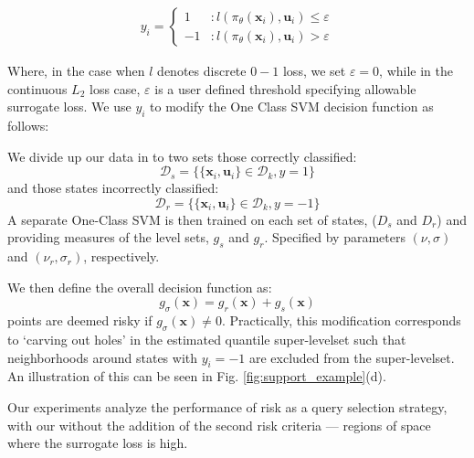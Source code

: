 \documentclass[10pt, conference]{ieeeconf}      %
\newcommand{\bu}{\mathbf{u}}
\newcommand{\bx}{\mathbf{x}}
\newcommand{\acro}{SHIV}
\begin{document}
\begin{align}
y_i = \left\{
     \begin{array}{lr}
         1 & : l(\pi_{\theta}(\bx_i),\bu_i)\le \varepsilon\\
         -1 & : l(\pi_{\theta}(\bx_i),\bu_i)>\varepsilon
     \end{array}
   \right.
\end{align}

Where, in the case when $l$ denotes discrete $0-1$ loss, we set $\varepsilon = 0$, while in the continuous $L_2$ loss
case, $\varepsilon$ is a user defined threshold specifying allowable surrogate loss.
We use $y_i$ to modify the One Class SVM decision function as follows: 


We divide up our data in to two sets those correctly classified:
$$\mathcal{D}_{s}=\{\lbrace \bx_i,\bu_i \rbrace \in \mathcal{D}_{k}, y=1\}$$
and those states incorrectly classified: 
$$\mathcal{D}_{r}=\{\lbrace \bx_i,\bu_i \rbrace \in \mathcal{D}_{k}, y=-1\}$$
A separate One-Class SVM is then trained on each set of states, ($D_{s}$ and $D_{r}$) and providing measures of the level sets, $g_{s}$ and $g_{r}$. Specified by parameters $(\nu,\sigma)$ and $(\nu_r,\sigma_r)$, respectively. 

We then define the overall decision function as:
$$g_{\sigma}(\bx) = g_{r} (\bx)+ g_{s}(\bx)$$
points are deemed risky if $g_{\sigma}(\bx) \neq 0$.  Practically, this modification corresponds to
`carving out holes' in the estimated quantile super-levelset such that neighborhoods around states with $y_i=-1$ are
excluded from the super-levelset. An illustration of this can be seen in Fig. \ref{fig:support_example}(d).

Our experiments analyze the performance of risk as a query selection strategy, with our without the addition of the second risk criteria --- regions of space where the surrogate loss is high.


\end{document}
